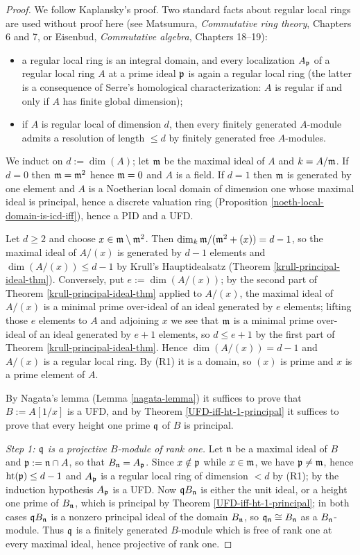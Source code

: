 \begin{proof}
We follow Kaplansky's proof.
Two standard facts about regular local rings are used without proof here
(see Matsumura, \emph{Commutative ring theory}, Chapters 6 and 7, or
Eisenbud, \emph{Commutative algebra}, Chapters 18--19):
\begin{itemize}
\item[(R1)]
a regular local ring is an integral domain, and every localization $A_{\mathfrak{p}}$ of a
regular local ring $A$ at a prime ideal ${\mathfrak{p}}$ is again a regular local ring
(the latter is a consequence of Serre's homological characterization: $A$ is
regular if and only if $A$ has finite global dimension);
\item[(R2)]
if $A$ is regular local of dimension $d$, then every finitely generated
$A$-module admits a resolution of length $\leq d$ by finitely generated free
$A$-modules.
\end{itemize}

We induct on $d:=\dim(A)$; let ${\mathfrak{m}}$ be the maximal ideal of $A$ and $k=A/{\mathfrak{m}}$.
If $d=0$ then ${\mathfrak{m}}={\mathfrak{m}}^2$ hence ${\mathfrak{m}}=0$ and $A$ is a field.
If $d=1$ then ${\mathfrak{m}}$ is generated by one element and $A$ is a Noetherian local
domain of dimension one whose maximal ideal is principal, hence a discrete
valuation ring (Proposition \ref{noeth-local-domain-is-icd-iff}), hence a PID and
a UFD.

Let $d\geq 2$ and choose $x\in{\mathfrak{m}}\setminus{\mathfrak{m}}^2$.
Then $\dim_k{\mathfrak{m}}/({\mathfrak{m}}^2+(x))=d-1$, so the maximal ideal of $A/(x)$ is generated by
$d-1$ elements and $\dim(A/(x))\leq d-1$ by Krull's Hauptidealsatz
(Theorem \ref{krull-principal-ideal-thm}).
Conversely, put $e:=\dim(A/(x))$; by the second part of
Theorem \ref{krull-principal-ideal-thm} applied to $A/(x)$, the maximal ideal of
$A/(x)$ is a minimal prime over-ideal of an ideal generated by $e$ elements;
lifting those $e$ elements to $A$ and adjoining $x$ we see that ${\mathfrak{m}}$ is a minimal
prime over-ideal of an ideal generated by $e+1$ elements, so $d\leq e+1$ by the
first part of Theorem \ref{krull-principal-ideal-thm}.
Hence $\dim(A/(x))=d-1$ and $A/(x)$ is a regular local ring.
By (R1) it is a domain, so $(x)$ is prime and $x$ is a prime element of $A$.

By Nagata's lemma (Lemma \ref{nagata-lemma}) it suffices to prove that
$B:=A[1/x]$ is a UFD, and by Theorem \ref{UFD-iff-ht-1-principal} it suffices to
prove that every height one prime ${\mathfrak{q}}$ of $B$ is principal.

\emph{Step 1: ${\mathfrak{q}}$ is a projective $B$-module of rank one.}
Let ${\mathfrak{n}}$ be a maximal ideal of $B$ and ${\mathfrak{p}}:={\mathfrak{n}}\cap A$, so that
$B_{\mathfrak{n}}=A_{\mathfrak{p}}$. Since $x\notin{\mathfrak{p}}$ while $x\in{\mathfrak{m}}$, we have ${\mathfrak{p}}\neq{\mathfrak{m}}$, hence
${\mathrm{ht}}({\mathfrak{p}})\leq d-1$ and $A_{\mathfrak{p}}$ is a regular local ring of dimension $<d$ by
(R1); by the induction hypothesis $A_{\mathfrak{p}}$ is a UFD.
Now ${\mathfrak{q}} B_{\mathfrak{n}}$ is either the unit ideal, or a height one prime of $B_{\mathfrak{n}}$, which
is principal by Theorem \ref{UFD-iff-ht-1-principal};
in both cases ${\mathfrak{q}} B_{\mathfrak{n}}$ is a nonzero principal ideal of the domain $B_{\mathfrak{n}}$, so
${\mathfrak{q}}_{\mathfrak{n}}\cong B_{\mathfrak{n}}$ as a $B_{\mathfrak{n}}$-module.
Thus ${\mathfrak{q}}$ is a finitely generated $B$-module which is free of rank one at every
maximal ideal, hence projective of rank one.


\end{proof}
